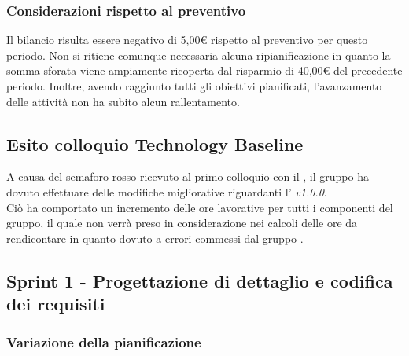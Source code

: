\subsubsection{Considerazioni rispetto al preventivo} \label{subsubsection:considerazioni_finali_PoC}
Il bilancio risulta essere negativo di 5,00€ rispetto al preventivo per questo periodo.
Non si ritiene comunque necessaria alcuna ripianificazione in quanto la somma sforata viene ampiamente ricoperta dal risparmio di 40,00€ del precedente periodo.
Inoltre, avendo raggiunto tutti gli obiettivi pianificati, l'avanzamento delle attività non ha subito alcun rallentamento.

\subsection{Esito colloquio Technology Baseline} \label{subsubsection:esito_TB}
A causa del semaforo rosso ricevuto al primo colloquio con il \commitNameS{}, il gruppo ha dovuto effettuare delle modifiche migliorative riguardanti l'\docNameAdR{} \textit{v1.0.0}.\\
Ciò ha comportato un incremento delle ore lavorative per tutti i componenti del gruppo, il quale non verrà preso in considerazione nei calcoli delle ore da rendicontare in quanto dovuto a errori commessi dal gruppo \groupName{}.
\pagebreak

\subsection{Sprint 1 - Progettazione di dettaglio e codifica dei requisiti} \label{subsection:consuntivo_sprint1}
\subsubsection{Variazione della pianificazione} \label{subsubsection:variazione_pianificazione_sprint1}

